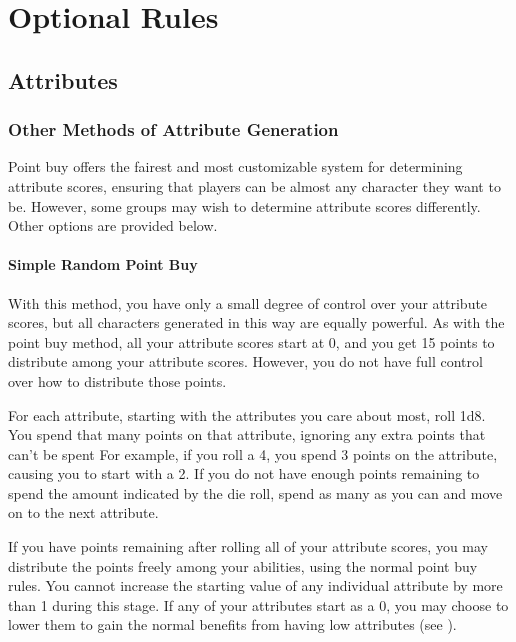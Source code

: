 \chapter{Optional Rules}

\section{Attributes}

    \subsection{Other Methods of Attribute Generation}
        Point buy offers the fairest and most customizable system for determining attribute scores, ensuring that players can be almost any character they want to be. However, some groups may wish to determine attribute scores differently. Other options are provided below.

        \subsubsection{Simple Random Point Buy}
            With this method, you have only a small degree of control over your attribute scores, but all characters generated in this way are equally powerful.
            As with the point buy method, all your attribute scores start at 0, and you get 15 points to distribute among your attribute scores.
            However, you do not have full control over how to distribute those points.

            For each attribute, starting with the attributes you care about most, roll 1d8.
            You spend that many points on that attribute, ignoring any extra points that can't be spent
            For example, if you roll a 4, you spend 3 points on the attribute, causing you to start with a 2.
            If you do not have enough points remaining to spend the amount indicated by the die roll, spend as many as you can and move on to the next attribute.

            If you have points remaining after rolling all of your attribute scores, you may distribute the points freely among your abilities, using the normal point buy rules.
            You cannot increase the starting value of any individual attribute by more than 1 during this stage.
            If any of your attributes start as a 0, you may choose to lower them to gain the normal benefits from having low attributes (see ).

